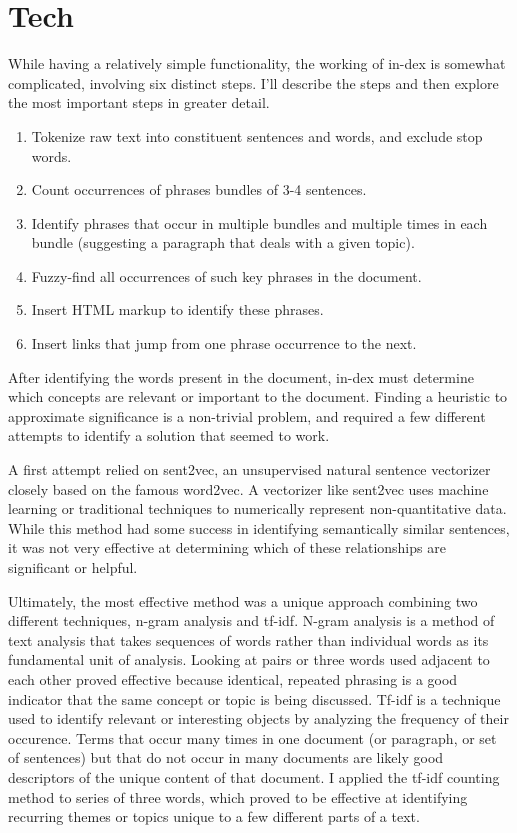 \documentclass[12pt]{article}
\begin{document}
	\section{Tech}

	While having a relatively simple functionality, the working of in-dex is
	somewhat complicated, involving six distinct steps. I’ll describe the
	steps and then explore the most important steps in greater detail.
	 
	\begin{enumerate}
		\item Tokenize raw text into constituent sentences and words, and
			exclude stop words.
		\item Count occurrences of phrases bundles of 3-4 sentences.
		\item Identify phrases that occur in multiple bundles and multiple times
			in each bundle (suggesting a paragraph that deals with a given topic).
		\item Fuzzy-find all occurrences of such key phrases in the document.
		\item Insert HTML markup to identify these phrases.
		\item Insert links that jump from one phrase occurrence to the next.
	\end{enumerate}

	After identifying the words present in the document, in-dex must determine
	which concepts are relevant or important to the document. Finding a
	heuristic to approximate significance is a non-trivial problem, and
	required a few different attempts to identify a solution that seemed to
	work.

	A first attempt relied on sent2vec, an unsupervised natural sentence
	vectorizer closely based on the famous word2vec. A vectorizer like sent2vec
	uses machine learning or traditional techniques to numerically represent
	non-quantitative data.\autocite{s2v} While this method had some success in
	identifying semantically similar sentences, it was not very effective at
	determining which of these relationships are significant or helpful.

	Ultimately, the most effective method was a unique approach combining
	two different techniques, n-gram analysis and tf-idf. N-gram analysis is a
	method of text analysis that takes sequences of words rather than
	individual words as its fundamental unit of analysis. Looking at pairs or
	three words used adjacent to each other proved effective because identical,
	repeated phrasing is a good indicator that the same concept or topic is
	being discussed. Tf-idf is a technique used to identify relevant or
	interesting objects by analyzing the frequency of their
	occurence.\autocite{tfidf} Terms that occur many times in one document (or
	paragraph, or set of sentences) but that do not occur in many documents are
	likely good descriptors of the unique content of that document. I applied
	the tf-idf counting method to series of three words, which proved to be
	effective at identifying recurring themes or topics unique to a few
	different parts of a text.
\end{document}
